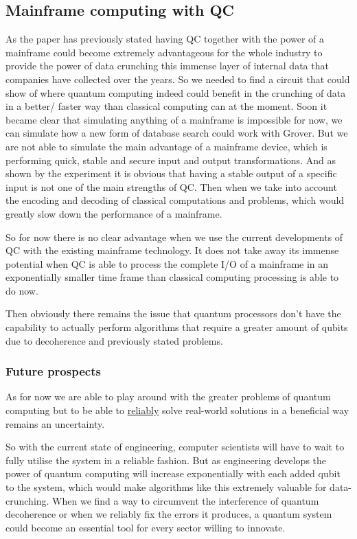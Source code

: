 \subsection{Mainframe computing with QC}

As the paper has previously stated having QC together with the power of a mainframe could become extremely advantageous for the whole industry to provide the power of data crunching this immense layer of internal data that companies have collected over the years. So we needed to find a circuit that could show of where quantum computing indeed could benefit in the crunching of data in a better/ faster way than classical computing can at the moment. Soon it became clear that simulating anything of a mainframe is impossible for now, we can simulate how a new form of database search could work with Grover. But we are not able to simulate the main advantage of a mainframe device, which is performing quick, stable and secure input and output transformations. And as shown by the experiment it is obvious that having a stable output of a specific input is not one of the main strengths of QC. Then when we take into account the encoding and decoding of classical computations and problems, which would greatly slow down the performance of a mainframe.

So for now there is no clear advantage when we use the current developments of QC with the existing mainframe technology. It does not take away its immense potential when QC is able to process the complete I/O of a mainframe in an exponentially smaller time frame than classical computing processing is able to do now.

Then obviously there remains the issue that quantum processors don't have the capability to actually perform algorithms that require a greater amount of qubits due to decoherence and previously stated problems.

\subsubsection{Future prospects}

As for now we are able to play around with the greater problems of quantum computing but to be able to \underline{reliably} solve real-world solutions in a beneficial way remains an uncertainty.

So with the current state of engineering, computer scientists will have to wait to fully utilise the system in a reliable fashion. But as engineering develops the power of quantum computing will increase exponentially with each added qubit to the system, which would make algorithms like this extremely valuable for data-crunching. When we find a way to circumvent the interference of quantum decoherence or when we reliably fix the errors it produces, a quantum system could become an essential tool for every sector willing to innovate. 


